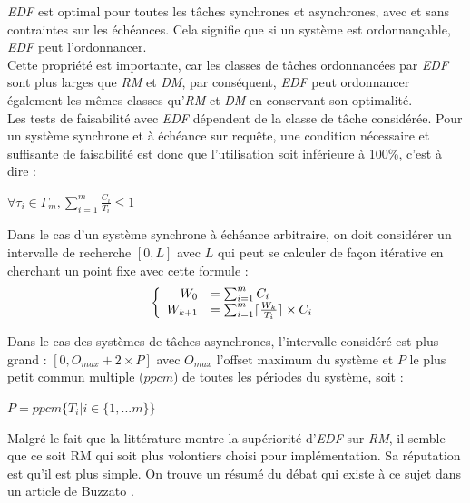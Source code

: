\documentclass[11pt,a4paper,oneside]{report}
\begin{document}
\textit{EDF} est optimal pour toutes les tâches synchrones et asynchrones, avec et sans 
contraintes sur les échéances. 
Cela signifie que si un système est ordonnançable, \textit{EDF} peut l'ordonnancer.\\
Cette propriété est importante, car les classes de tâches ordonnancées par \textit{EDF} 
sont plus larges que \textit{RM} et \textit{DM}, par conséquent, \textit{EDF} peut ordonnancer également les 
mêmes classes qu'\textit{RM} et \textit{DM} en conservant son optimalité. \\

Les tests de faisabilité avec \textit{EDF} dépendent de la classe de tâche considérée. 
Pour un système synchrone et à échéance sur requête, 
une condition nécessaire et suffisante de faisabilité est donc que l'utilisation soit inférieure 
à 100\%, c'est à dire : \\
\begin{center}
	$\forall \tau_i \in \Gamma_m, \sum_{i=1}^{m}\frac{C_i}{T_i} \leq 1 $
\end{center}

Dans le cas d'un système synchrone à échéance arbitraire, on doit considérer un intervalle de 
recherche $[0, L]$ avec $L$ qui peut se calculer de façon itérative en cherchant un point fixe 
avec cette formule : \\
\[
\left \{
\begin{array}{r l}
W_0 &= \sum_{i = 1}^{m}C_i\\
W_{k+1} & =\sum_{i = 1}^{m} \lceil \frac{W_k}{T_i} \rceil \times C_i
\end{array}
\right.
\]

Dans le cas des systèmes de tâches asynchrones, l'intervalle considéré est plus grand : 
$[0, O_{max} + 2 \times P]$ avec $O_{max}$ l'offset maximum du système et 
$P$ le plus petit commun multiple ($ppcm$) de toutes les périodes du système, soit : \\
\begin{center}
	$P = ppcm\{T_i | i \in \{1, ... m\}\}$
\end{center}

Malgré le fait que la littérature montre la supériorité d'\textit{EDF} sur \textit{RM}, 
il semble que ce soit RM qui soit plus volontiers choisi pour implémentation. 
Sa réputation est qu'il est plus simple. 
On trouve un résumé du débat qui existe à ce sujet dans un article de Buzzato
\cite{buttazzo_rate_2005}.
\end{document}
